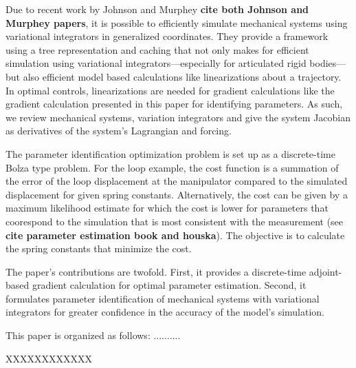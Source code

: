 \documentclass[letterpaper, 10pt, conference]{ieeeconf}
\begin{document}
Due to recent work by Johnson and Murphey \textbf{cite both Johnson and Murphey papers}, it is possible to efficiently simulate mechanical systems using variational integrators in generalized coordinates. They provide a framework using a tree representation and caching that not only makes for efficient simulation using variational integrators---especially for articulated rigid bodies---but also efficient model based calculations like linearizations about a trajectory.   In optimal controls, linearizations are needed for gradient calculations like the gradient calculation presented in this paper for identifying parameters.  As such, we review mechanical systems, variation integrators and give the system Jacobian as derivatives of the system's Lagrangian and forcing. 

The parameter identification optimization problem is set up as a discrete-time Bolza type problem.  For the loop example, the cost function is a summation of the error of the loop displacement at the manipulator compared to the simulated displacement for given spring constants.  Alternatively, the cost can be given by a maximum likelihood estimate for which the cost is lower for parameters that coorespond to the simulation that is most consistent with the measurement (see \textbf{cite parameter estimation book and houska}).  The objective is to calculate the spring constants that minimize the cost.  

The paper's contributions are twofold.  First, it provides a discrete-time adjoint-based gradient calculation for optimal parameter estimation.  Second, it formulates parameter identification of mechanical systems with variational integrators for greater confidence in the accuracy of the model's simulation.

This paper is organized as follows: ..........


XXXXXXXXXXXX



\end{document}
